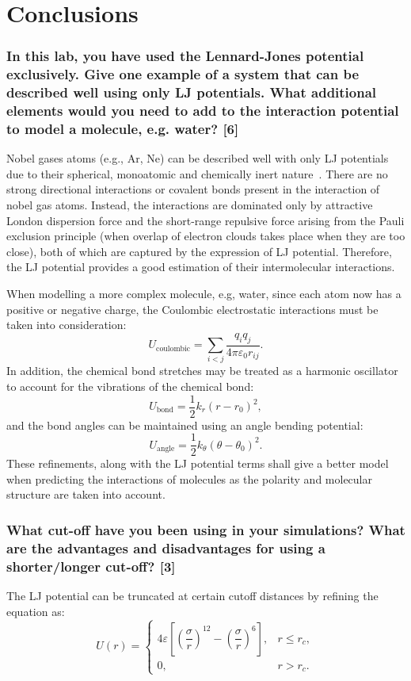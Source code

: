 \documentclass[a4paper,10pt,twocolumn]{article}
\begin{document}
\section{Conclusions} %

\subsubsection*{In this lab, you have used the Lennard-Jones potential exclusively. Give one example of a system that can be described well using only LJ potentials. What additional elements would you need to add to the interaction potential to model a molecule, e.g. water? [6]}

Nobel gases atoms (e.g., Ar, Ne) can be described well with only LJ potentials due to their spherical, monoatomic and chemically inert nature~\cite{lenhard2024history}. There are no strong directional interactions or covalent bonds present in the interaction of nobel gas atoms. Instead, the interactions are dominated only by attractive London dispersion force and the short-range repulsive force arising from the Pauli exclusion principle (when overlap of electron clouds takes place when they are too close), both of which are captured by the expression of LJ potential. Therefore, the LJ potential provides a good estimation of their intermolecular interactions.

When modelling a more complex molecule, e.g, water, since each atom now has a positive or negative charge, the Coulombic electrostatic interactions must be taken into consideration:
\[
U_{\text{coulombic}}=\sum_{i<j}\frac{q_i q_j}{4\pi\varepsilon_0 r_{ij}}.
\]
In addition, the chemical bond stretches may be treated as a harmonic oscillator to account for the vibrations of the chemical bond:
\[
U_{\text{bond}}=\frac{1}{2}k_r(r-r_0)^2,
\]
and the bond angles can be maintained using an angle bending potential:
\[
U_{\text{angle}}=\frac{1}{2}k_\theta(\theta-\theta_0)^2.
\]
These refinements, along with the LJ potential terms shall give a better model when predicting the interactions of molecules as the polarity and molecular structure are taken into account.

\subsubsection*{What cut-off have you been using in your simulations? What are the advantages and disadvantages for using a shorter/longer cut-off? [3]}
The LJ potential can be truncated at certain cutoff distances by refining the equation as:
\[
U(r) =
\begin{cases}
4\varepsilon \left[ \left(\dfrac{\sigma}{r}\right)^{12}
- \left(\dfrac{\sigma}{r}\right)^6 \right], & r \le r_c, \\[6pt]
0, & r > r_c .
\end{cases}
\]
\end{document}
